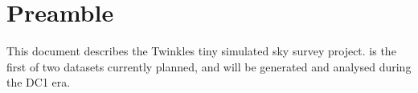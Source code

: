 \chapter*{Preamble}
\def\chpname{preamble}
\label{chp:\chpname}

This document describes the Twinkles tiny simulated sky survey project.
\TwinklesOne is the first of two datasets currently planned, and will
be generated and analysed during the DC1 era.

